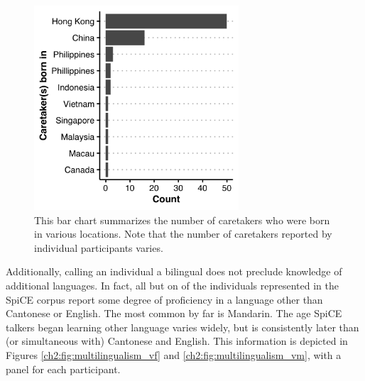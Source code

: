 \begin{figure}[!htbp]
  \begin{center}
  \includegraphics[width=3in]{figures/ch2_caretakers_3in.png} 
  \caption{This bar chart summarizes the number of caretakers who were born in various locations. Note that the number of caretakers reported by individual participants varies.}
  \label{ch2:fig:caretakers}
  \end{center}
\end{figure}

Additionally, calling an individual a bilingual does not preclude knowledge of additional languages. In fact, all but on of the individuals represented in the SpiCE corpus report some degree of proficiency in a language other than Cantonese or English. The most common by far is Mandarin. The age SpiCE talkers began learning other language varies widely, but is consistently later than (or simultaneous with) Cantonese and English. This information is depicted in Figures \ref{ch2:fig:multilingualism_vf} and \ref{ch2:fig:multilingualism_vm}, with a panel for each participant.

